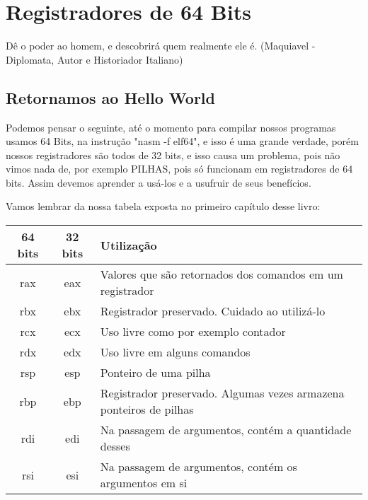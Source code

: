 \chapter{Registradores de 64 Bits}

\begin{remark}
	Dê o poder ao homem, e descobrirá quem realmente ele é. (Maquiavel - Diplomata, Autor e Historiador Italiano) 
\end{remark}

\section{Retornamos ao Hello World}
Podemos pensar o seguinte, até o momento para compilar nossos programas usamos 64 Bits, na instrução "nasm -f elf64", e isso é uma grande verdade, porém nossos registradores são todos de 32 bits, e isso causa um problema, pois não vimos nada de, por exemplo PILHAS, pois só funcionam em registradores de 64 bits. Assim devemos aprender a usá-los e a usufruir de seus benefícios.

Vamos lembrar da nossa tabela exposta no primeiro capítulo desse livro:
\begin{table}[H]
	\centering 
	\begin{tabular}{c | c | l }
		\textbf{64 bits} & \textbf{32 bits} & \textbf{Utilização} \\ \hline
		rax & eax & Valores que são retornados dos comandos em um registrador \\
		rbx & ebx & Registrador preservado. Cuidado ao utilizá-lo \\
		rcx & ecx & Uso livre como por exemplo contador \\
		rdx & edx & Uso livre em alguns comandos \\
		rsp & esp & Ponteiro de uma pilha \\
		rbp & ebp & Registrador preservado. Algumas vezes armazena ponteiros de pilhas \\
		rdi & edi & Na passagem de argumentos, contém a quantidade desses \\
		rsi & esi & Na passagem de argumentos, contém os argumentos em si \\
	\end{tabular}
\end{table}

